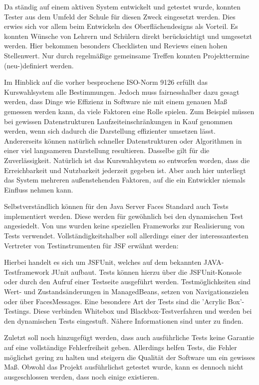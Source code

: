 	

Da ständig auf einem aktiven System entwickelt und getestet wurde, konnten Tester aus dem Umfeld der Schule für diesen Zweck eingesetzt werden.
Dies erwies sich vor allem beim Entwickeln des Oberflächendesigns als Vorteil. Es konnten Wünsche von Lehrern und Schülern direkt berücksichtigt und umgesetzt werden.
Hier bekommen besonders Checklisten und Reviews einen hohen Stellenwert. Nur durch regelmäßige gemeinsame Treffen konnten Projekttermine (neu-)definiert werden.

Im Hinblick auf die vorher besprochene ISO-Norm 9126 erfüllt das Kurswahlsystem alle Bestimmungen. Jedoch muss fairnesshalber dazu gesagt werden, dass Dinge wie Effizienz in Software nie mit einem genauen Maß gemessen werden kann, da viele Faktoren eine Rolle spielen.
Zum Beispiel müssen bei gewissen Datenstrukturen Laufzeiteinschränkungen in Kauf genommen werden, wenn sich dadurch die Darstellung effizienter umsetzen lässt. Andererseits können natürlich schneller Datenstrukturen oder Algorithmen in einer viel langsameren Darstellung resultieren.
Dasselbe gilt für die Zuverlässigkeit. Natürlich ist das Kurswahlsystem so entworfen worden, dass die Erreichbarkeit und Nutzbarkeit jederzeit gegeben ist. Aber auch hier unterliegt das System mehreren außenstehenden Faktoren, auf die ein Entwickler niemals Einfluss nehmen kann.

Selbstverständlich können für den Java Server Faces Standard auch Tests implementiert werden. Diese werden für gewöhnlich bei den dynamischen Test angesiedelt. Von uns wurden keine speziellen Frameworks zur Realisierung von Tests verwendet. Vollständigkeitshalber soll allerdings einer der interessantesten Vertreter von Testinstrumenten für JSF erwähnt werden:

Hierbei handelt es sich um \gls{JSFUnit}, welches auf dem bekannten JAVA-Testframework \gls{JUnit} aufbaut. Tests können hierzu über die JSFUnit-Konsole oder durch den Aufruf einer Testseite ausgeführt werden. Testmöglichkeiten sind Wert- und Zustandsänderungen in ManagedBeans, setzen von Navigationszielen oder über FacesMessages.
Eine besondere Art der Tests sind die 'Acrylic Box'-Testings. Diese verbinden Whitebox und Blackbox-Testverfahren und werden bei den dynamischen Tests eingestuft.
Nähere Informationen sind unter \cite{JSFUnit01} zu finden.

Zuletzt soll noch hinzugefügt werden, dass auch ausführliche Tests keine Garantie auf eine vollständige Fehlerfreiheit geben.
Allerdings helfen Tests, die Fehler möglichst gering zu halten und steigern die Qualität der Software um ein gewisses Maß.
Obwohl das Projekt ausführlichst getestet wurde, kann es dennoch nicht ausgeschlossen werden, dass noch einige existieren. 
